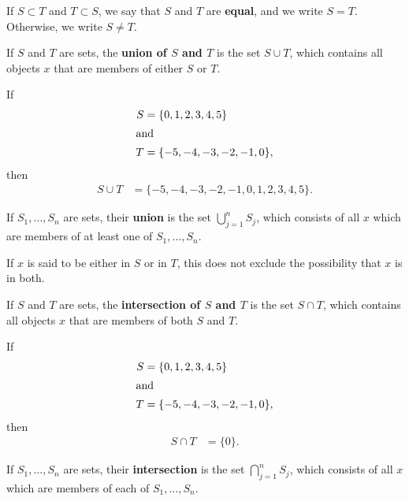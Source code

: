 \documentclass[12pt]{article}
\begin{document}
\begin{defn}
  If $S \subset T$ and $T \subset S$, we say that $S$ and $T$ are \textbf{equal}, and
  we write $S = T$. Otherwise, we write $S \neq T$.
\end{defn}

\begin{defn}
  If $S$ and $T$ are sets, the \textbf{union of $S$ and $T$} is the set $S \cup T$,
  which contains all objects $x$ that are members of either $S$ or $T$.

  \begin{exm}
    If
    \begin{align*}
      S &= \{0,1,2,3,4,5\}\\
      \shortintertext{and}
      T &= \{-5,-4,-3,-2,-1,0\},
    \end{align*}
    then
    \begin{align*}
      S \cup T &= \{-5,-4,-3,-2,-1,0,1,2,3,4,5\}.
    \end{align*}
  \end{exm}

  If $S_1,\ldots,S_n$ are sets, their \textbf{union} is the set $\bigcup_{j =
  1}^{n}S_j$, which consists of all $x$ which are members of at least one of
  $S_1,\ldots,S_n$.
\end{defn}

\begin{comm}
  If $x$ is said to be either in $S$ or in $T$, this does not exclude the possibility
  that $x$ is in both.
\end{comm}

\begin{defn}
  If $S$ and $T$ are sets, the \textbf{intersection of $S$ and $T$} is the set $S
  \cap T$, which contains all objects $x$ that are members of both $S$ and $T$.

  \begin{exm}
    If
    \begin{align*}
      S &= \{0,1,2,3,4,5\}\\
      \shortintertext{and}
      T &= \{-5,-4,-3,-2,-1,0\},
    \end{align*}
    then
    \begin{align*}
      S \cap T &= \{0\}.
    \end{align*}
  \end{exm}

  If $S_1,\ldots,S_n$ are sets, their \textbf{intersection} is the set $\bigcap_{j =
  1}^{n}S_j$, which consists of all $x$ which are members of each of
  $S_1,\ldots,S_n$.
\end{defn}
\end{document}
